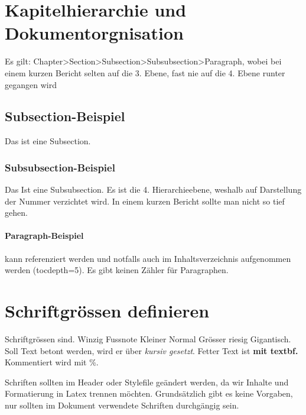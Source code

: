 

\section{Kapitelhierarchie und Dokumentorgnisation}\label{sec:Struktur}
Es gilt: Chapter>Section>Subsection>Subsubsection>Paragraph, wobei bei einem kurzen Bericht selten auf die 3. Ebene, fast nie auf die 4. Ebene runter gegangen wird
\subsection{Subsection-Beispiel}\label{sec:Struktur-Subsection}
Das ist eine Subsection.
\subsubsection{Subsubsection-Beispiel}\label{sec:Struktur-Subsection-Subsubsection}
Das Ist eine Subsubsection. Es ist die 4. Hierarchieebene, weshalb auf Darstellung der Nummer verzichtet wird. In einem kurzen Bericht sollte man nicht so tief gehen.
\paragraph{Paragraph-Beispiel} kann referenziert werden und notfalls auch im Inhaltsverzeichnis aufgenommen werden (tocdepth=5). Es gibt keinen Zähler für Paragraphen.
\section{Schriftgrössen definieren} \label{sec:Schriften}
Schriftgrössen sind. {\tiny Winzig} {\footnotesize Fussnote} {\small Kleiner} {\normalsize Normal} {\Large Grösser} {\huge riesig} {\Huge Gigantisch}. Soll Text betont werden, wird er über \textit{kursiv gesetzt}. Fetter Text ist \textbf{mit textbf.} Kommentiert wird mit \%. 

Schriften sollten im Header oder Stylefile geändert werden, da wir Inhalte und Formatierung in Latex trennen möchten. Grundsätzlich gibt es keine Vorgaben, nur sollten im Dokument verwendete Schriften durchgängig sein.
